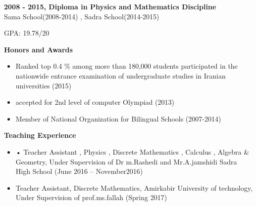 \documentclass[a4paper,12pt,final]{memoir}
\newcommand{\Sep}{\vspace{1.5em}}
\newcommand{\SmallSep}{\vspace{0.5em}}
\newcommand{\CVSection}[1]
	{\Large\textbf{#1}\par
	\SmallSep\normalsize\normalfont}
\newcommand{\CVItem}[1]
	{\textbf{\color{RoyalBlue} #1}}
\begin{document}
\CVItem{2008 - 2015, Diploma in Physics and Mathematics Discipline}\\
Sama School(2008-2014) , Sadra School(2014-2015)

GPA: 19.78/20
\Sep

\CVSection{Honors and Awards}
\begin{itemize}
	\item Ranked top 0.4 \% among more than 180,000 students participated
in the nationwide entrance examination of undergraduate studies
in Iranian universities (2015) 

	\item accepted for 2nd level of computer Olympiad (2013)
	\item Member of National Organization for Bilingual Schools (2007-2014)
 
\end{itemize}

\Sep



\CVSection{Teaching Experience}
	\begin{itemize}
		\item  •	Teacher Assistant , Physics , Discrete Mathematics , Calculus ,  Algebra & Geometry, Under Supervision of Dr m.Rashedi and Mr.A.jamshidi
		Sadra High School (June 2016 – November2016)
	\item  Teacher Assistant, Discrete Mathematics, Amirkabir University of technology, Under Supervision of prof.ms.fallah (Spring 2017)
	\end{itemize}
\Sep

\newpage
\normalsize\normalfont
\framebreak
\framebreak
\\
\end{document}
